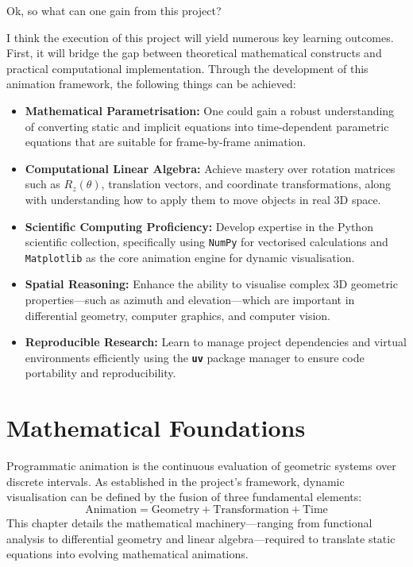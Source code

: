 \documentclass[12pt, a4paper]{report}
\begin{document}
Ok, so what can one gain from this project?

I think the execution of this project will yield numerous key learning outcomes. First, it will bridge the gap between theoretical mathematical constructs and practical computational implementation. Through the development of this animation framework, the following things can be achieved:

\begin{itemize}
    \item \textbf{Mathematical Parametrisation:} One could gain a robust understanding of converting static and implicit equations into time-dependent parametric equations that are suitable for frame-by-frame animation.
    
    \item \textbf{Computational Linear Algebra:} Achieve mastery over rotation matrices such as \(R_z(\theta)\), translation vectors, and coordinate transformations, along with understanding how to apply them to move objects in real 3D space.
    
    \item \textbf{Scientific Computing Proficiency:} Develop expertise in the Python scientific collection, specifically using \texttt{NumPy} for vectorised calculations and \texttt{Matplotlib} as the core animation engine for dynamic visualisation.
    
    \item \textbf{Spatial Reasoning:} Enhance the ability to visualise complex 3D geometric properties—such as azimuth and elevation—which are important in differential geometry, computer graphics, and computer vision.
    
    \item \textbf{Reproducible Research:} Learn to manage project dependencies and virtual environments efficiently using the \textbf{\texttt{uv}} package manager to ensure code portability and reproducibility.
\end{itemize}


 \chapter{Mathematical Foundations}

Programmatic animation is the continuous evaluation of geometric systems over discrete intervals. As established in the project's framework, dynamic visualisation can be defined by the fusion of three fundamental elements:
\begin{equation}
    \text{Animation} = \text{Geometry} + \text{Transformation} + \text{Time}
\end{equation}
This chapter details the mathematical machinery—ranging from functional analysis to differential geometry and linear algebra—required to translate static equations into evolving mathematical animations.
\end{document}
